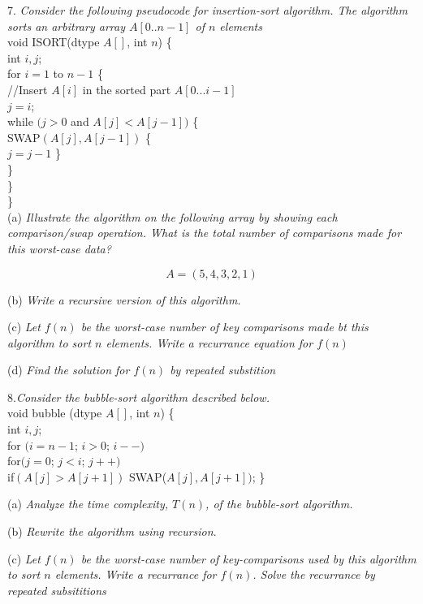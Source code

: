 \documentclass[10pt]{article}
\newcommand\tab[1][.5cm]{\hspace*{#1}}
\begin{document}
7. \textit{Consider the following pseudocode for insertion-sort algorithm.  The algorithm sorts an arbitrary array $A[0..n-1]$ of $n$ elements}\\
\tab void ISORT(dtype $A[]$, int $n$) \{\\
\tab int $i,j$;\\
\tab for $i=1$ to $n-1$ \{\\
\tab \tab //Insert $A[i]$ in the sorted part $A[0...i-1]$\\
\tab \tab $j=i$;\\
\tab \tab while $(j > 0$ and $A[j] < A[j-1])$ \{\\
\tab \tab \tab SWAP$(A[j],A[j-1])$ \{\\
\tab \tab \tab $j=j-1$ \}\\
\tab \tab \tab \}\\
\tab \tab \}\\
\tab \}\\

(a) \textit{Illustrate the algorithm on the following array by showing each comparison/swap operation.  What is the total number of comparisons made for this worst-case data?}

$$A=(5,4,3,2,1)$$

(b) \textit{Write a recursive version of this algorithm.}

(c) \textit{Let $f(n)$ be the worst-case number of key comparisons made bt this algorithm to sort $n$ elements.  Write a recurrance equation for $f(n)$}

(d) \textit{Find the solution for $f(n)$ by repeated substition}

8.\textit{Consider the bubble-sort algorithm described below.}\\
\tab void bubble (dtype $A[]$, int $n$) \{\\
\tab int $i,j$;\\
\tab for $(i=n-1$; $i>0$; $i--)$\\
\tab \tab for$(j=0$; $j<i$; $j++)$\\
\tab \tab \tab if$(A[j]>A[j+1])$ \tab SWAP($A[j],A[j+1])$;
\tab \}

(a) \textit{Analyze the time complexity, $T(n)$, of the bubble-sort algorithm.}

(b) \textit{Rewrite the algorithm using recursion}.

(c) \textit{Let $f(n)$ be the worst-case number of key-comparisons used by this algorithm to sort $n$ elements.  Write a recurrance for $f(n)$.  Solve the recurrance by repeated subsititions}
\end{document}
